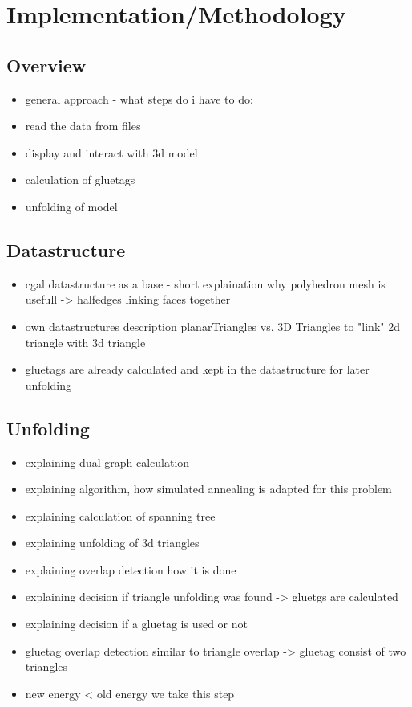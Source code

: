 \documentclass[draft,final]{vutinfth} %
\begin{document}
\chapter{Implementation/Methodology}

\section{Overview}

\begin{itemize}
	\item general approach - what steps do i have to do:
	\item read the data from files
	\item display and interact with 3d model
	\item calculation of gluetags
	\item unfolding of model
\end{itemize}

\section{Datastructure}

\begin{itemize}
	\item cgal datastructure as a base - short explaination why polyhedron mesh is usefull -> halfedges linking faces together
	\item own datastructures description planarTriangles vs. 3D Triangles to "link" 2d triangle with 3d triangle
	\item gluetags are already calculated and kept in the datastructure for later unfolding
\end{itemize}

\section{Unfolding}

\begin{itemize}
	\item explaining dual graph calculation
	\item explaining algorithm, how simulated annealing is adapted for this problem
	\item explaining calculation of spanning tree
	\item explaining unfolding of 3d triangles
	\item explaining overlap detection how it is done
	\item explaining decision if triangle unfolding was found -> gluetgs are calculated
	\item explaining decision if a gluetag is used or not
	\item gluetag overlap detection similar to triangle overlap -> gluetag consist of two triangles
	\item new energy < old energy we take this step
\end{itemize}
\end{document}
